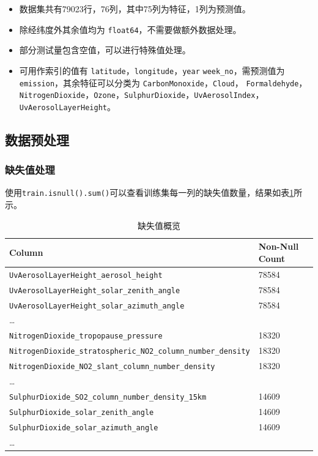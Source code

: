 \documentclass{ctexart}
\begin{document}
\begin{itemize}
      \item 数据集共有79023行，76列，其中75列为特征，1列为预测值。
      \item 除经纬度外其余值均为 \texttt{float64}，不需要做额外数据处理。
      \item 部分测试量包含空值，可以进行特殊值处理。
      \item 可用作索引的值有 \texttt{latitude}，\texttt{longitude}，\texttt{year} \texttt{week\_no}，需预测值为 \texttt{emission}，其余特征可以分类为 \texttt{CarbonMonoxide}，\texttt{Cloud}， \texttt{Formaldehyde}，\texttt{NitrogenDioxide}，\texttt{Ozone}，\texttt{SulphurDioxide}，\texttt{UvAerosolIndex}，\texttt{UvAerosolLayerHeight}。
\end{itemize}

\subsection{数据预处理}

\subsubsection{缺失值处理}

使用\verb|train.isnull().sum()|可以查看训练集每一列的缺失值数量，结果如表\ref{tab:1}所示。

\begin{table}[h]
      \centering
      \begin{tabular}{l|l}
      \hline
      Column & Non-Null Count \\ \hline
      \texttt{UvAerosolLayerHeight\_aerosol\_height} & 78584 \\
      \texttt{UvAerosolLayerHeight\_solar\_zenith\_angle} & 78584 \\
      \texttt{UvAerosolLayerHeight\_solar\_azimuth\_angle} & 78584 \\
      \ldots{} & \\
      \texttt{NitrogenDioxide\_tropopause\_pressure} & 18320 \\
      \texttt{NitrogenDioxide\_stratospheric\_NO2\_column\_number\_density} & 18320 \\
      \texttt{NitrogenDioxide\_NO2\_slant\_column\_number\_density} & 18320 \\
      \ldots{} & \\
      \texttt{SulphurDioxide\_SO2\_column\_number\_density\_15km} & 14609 \\
      \texttt{SulphurDioxide\_solar\_zenith\_angle} & 14609 \\
      \texttt{SulphurDioxide\_solar\_azimuth\_angle} & 14609 \\
      \ldots{} & \\
      \hline
      \end{tabular}
      \caption{\label{tab:1}缺失值概览}
\end{table}
\end{document}

